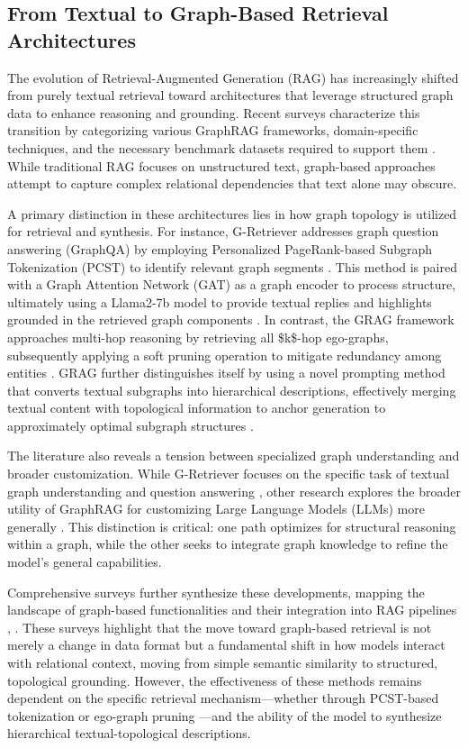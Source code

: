 \documentclass[11pt]{article}
\begin{document}
\subsection{From Textual to Graph-Based Retrieval Architectures}

The evolution of Retrieval-Augmented Generation (RAG) has increasingly shifted from purely textual retrieval toward architectures that leverage structured graph data to enhance reasoning and grounding. Recent surveys characterize this transition by categorizing various GraphRAG frameworks, domain-specific techniques, and the necessary benchmark datasets required to support them \citep{2501.00309}. While traditional RAG focuses on unstructured text, graph-based approaches attempt to capture complex relational dependencies that text alone may obscure.

A primary distinction in these architectures lies in how graph topology is utilized for retrieval and synthesis. For instance, G-Retriever addresses graph question answering (GraphQA) by employing Personalized PageRank-based Subgraph Tokenization (PCST) to identify relevant graph segments \citep{2402.07630}. This method is paired with a Graph Attention Network (GAT) as a graph encoder to process structure, ultimately using a Llama2-7b model to provide textual replies and highlights grounded in the retrieved graph components \citep{2402.07630}. In contrast, the GRAG framework approaches multi-hop reasoning by retrieving all \$k\$-hop ego-graphs, subsequently applying a soft pruning operation to mitigate redundancy among entities \citep{2405.16506}. GRAG further distinguishes itself by using a novel prompting method that converts textual subgraphs into hierarchical descriptions, effectively merging textual content with topological information to anchor generation to approximately optimal subgraph structures \citep{2405.16506}.

The literature also reveals a tension between specialized graph understanding and broader customization. While G-Retriever focuses on the specific task of textual graph understanding and question answering \citep{2402.07630}, other research explores the broader utility of GraphRAG for customizing Large Language Models (LLMs) more generally \citep{2501.13958}. This distinction is critical: one path optimizes for structural reasoning within a graph, while the other seeks to integrate graph knowledge to refine the model's general capabilities.

Comprehensive surveys further synthesize these developments, mapping the landscape of graph-based functionalities and their integration into RAG pipelines \citep{2408.08921}, \citep{2504.10499}. These surveys highlight that the move toward graph-based retrieval is not merely a change in data format but a fundamental shift in how models interact with relational context, moving from simple semantic similarity to structured, topological grounding. However, the effectiveness of these methods remains dependent on the specific retrieval mechanism—whether through PCST-based tokenization \citep{2402.07630} or ego-graph pruning \citep{2405.16506}—and the ability of the model to synthesize hierarchical textual-topological descriptions.
\end{document}
